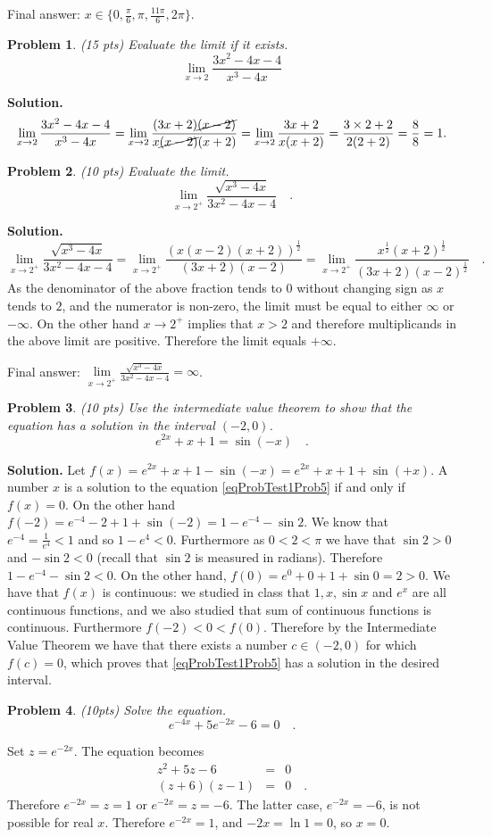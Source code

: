 \documentclass{article}
\newtheorem{problem}{Problem}
\begin{document}
Final answer: $x\in \{0, \frac{\pi}{6},\pi  , \frac{11\pi}{6},2\pi \}$.
\begin{problem} (15 pts) Evaluate the limit if it exists.
\[\lim\limits_{x\to 2} \frac{3x^2-4x-4}{x^3-4x}
\]
\end{problem}
\textbf{Solution.}
\[
\lim\limits_{x\to 2} \frac{3x^2-4x-4}{x^3-4x}= 
\lim\limits_{x\to 2}\frac{(3x+2 ) \cancel{(x-2)}} {x\cancel{(x-2)}(x+2)} = \lim\limits_{x\to 2} \frac{3x+2}{x(x+2)}= \frac{3\times 2+2 }{2(2+2)}= \frac{8}{8}=1.
\]
\begin{problem} (10 pts)
Evaluate the limit.
\[\lim\limits_{x\to 2^+} \frac{\sqrt{x^3-4x }}{3x^2 -4x-4 }\quad .
\]
\end{problem}
\textbf{Solution. }
\[
\lim\limits_{x\to 2^+} \frac{\sqrt{x^3-4x }}{3x^2 -4x-4 }=
\lim\limits_{x\to 2^+} \frac{\left( x(x-2)(x+2)\right)^{\frac{1}2}} {(3x+2)(x-2)} = \lim\limits_{x\to 2^+}\frac{ x^{\frac{1}2}(x+2)^{\frac{1}2}}{(3x+2)(x-2)^{\frac{1}2}}\quad .
\]
As the denominator of the above fraction tends to $0$ without changing sign as $x$ tends to $2$, and the numerator is non-zero, the limit must be equal to either $\infty$ or $-\infty$. On the other hand $x\to 2^{+}$ implies that $x>2$ and therefore multiplicands in the above limit are positive. Therefore the limit equals $+\infty$.

Final answer: $\lim\limits_{x\to 2^+} \frac{\sqrt{x^3-4x }}{3x^2 -4x-4 } =\infty$.
\begin{problem} (10 pts)
Use the intermediate value theorem to show that the equation has a solution in the interval $(-2,0)$.
\begin{equation}\label{eqProbTest1Prob5}
e^{2x}+x+1 =\sin  (-x) \quad .
\end{equation}
\end{problem}
\textbf{Solution.} Let $f(x) =  e^{2x}+x+1-\sin(-x)= e^{2x}+x+1+\sin(+x)$. A number $x$  is a solution to the equation \eqref{eqProbTest1Prob5} if and only if $f(x)=0$. On the other hand $f(-2)= e^{-4}-2+1+\sin(-2) = 1-e^{-4}-\sin 2$. We know that $e^{-4}=\frac{1}{e^4}<1$ and so $1-e^4<0$. Furthermore as $0<2<\pi$ we have that $\sin 2 >0 $  and $-\sin 2<0 $ (recall that $\sin 2$ is measured in radians). Therefore $ 1-e^{-4}-\sin 2 <0$. On the other hand, $f(0)= e^0+0+1+\sin 0=2>0$. We have that $f(x)$ is continuous: we studied in class that $1, x, \sin x$ and $ e^x$ are all continuous functions, and we also studied that sum of continuous functions is continuous. Furthermore $f(-2)<0<f(0)$. Therefore by the Intermediate Value Theorem we have that there exists a number $c\in (-2, 0)$ for which $f(c)=0$, which proves that \eqref{eqProbTest1Prob5} has a solution in the desired interval.
\begin{problem} (10pts)
Solve the equation.
\[e^{-4x}+5e^{-2x}-6=0\quad .
\]
\end{problem}
Set $z=e^{-2x}$. The equation becomes 
\[
\begin{array}{rcl}
z^2+5z-6&=&0\\
(z+6)(z-1)&=&0\quad .
\end{array}
\]
Therefore $e^{-2x}=z=1$ or $e^{-2x}=z=-6$. The latter case, $e^{-2x}=-6$, is not possible for real $x$. Therefore $e^{-2x}=1$, and $-2x=\ln 1=0$, so $x=0$.
\end{document}
